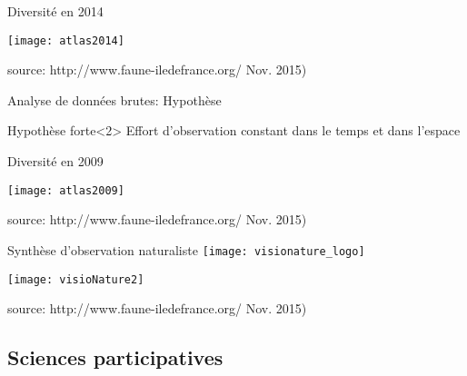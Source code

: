 \documentclass[10pt]{beamer}
\begin{document}
\begin{frame}{Diversité en 2014}
     \begin{center}
        \texttt{[image: atlas2014]}
  \end{center}
  \footnotesize{source: http://www.faune-iledefrance.org/ Nov. 2015)}
\end{frame}


\begin{frame}{Analyse de données brutes: Hypothèse}
     \begin{block}{Hypothèse forte}<2>
     Effort d'observation constant dans le temps et dans l'espace
     \end{block}
\end{frame}

\begin{frame}{Diversité en 2009}
     \begin{center}
        \texttt{[image: atlas2009]}
  \end{center}
 \footnotesize{source: http://www.faune-iledefrance.org/ Nov. 2015)} 
\end{frame}


\begin{frame}{Synthèse d'observation naturaliste}
 \texttt{[image: visionature\_logo]}\\
    \begin{center}
        \texttt{[image: visioNature2]}
  \end{center}
  \footnotesize{source: http://www.faune-iledefrance.org/ Nov. 2015)}
\end{frame}

\subsection{Sciences participatives} 
\end{document}

